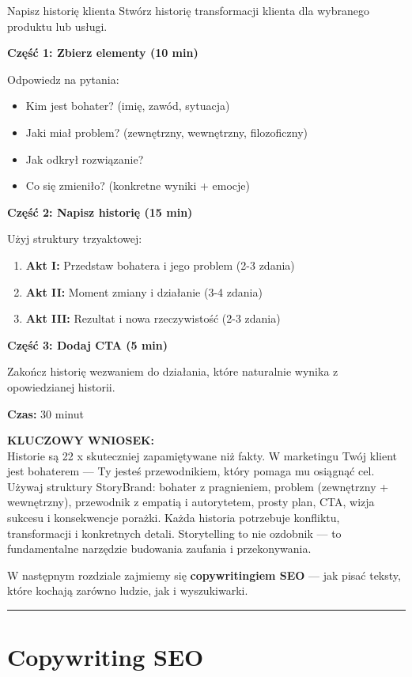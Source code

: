 \documentclass[
  12pt,
  a4paper,
  twoside,
  openright,
  12pt,
  DIV=12,
  BCOR=12mm]{scrbook}
\newcommand{\decoline}{%
  \begin{center}
    \textcolor{bordergray}{\rule{0.3\textwidth}{0.5pt}}
  \end{center}
}
\newcommand{\takeaway}[1]{%
  \begin{tcolorbox}[
    enhanced,
    colback=accentgreen!10,
    colframe=accentgreen,
    boxrule=0pt,
    borderline south={3pt}{0pt}{accentgreen},
    sharp corners,
    left=15pt, right=15pt, top=10pt, bottom=10pt
  ]
    \textbf{\color{accentgreen}KLUCZOWY WNIOSEK:}\\[5pt]
    #1
  \end{tcolorbox}
}
\begin{document}
\begin{cwiczenie}{Napisz historię klienta}
Stwórz historię transformacji klienta dla wybranego produktu lub usługi.

\textbf{Część 1: Zbierz elementy (10 min)}

Odpowiedz na pytania:
\begin{itemize}
  \item Kim jest bohater? (imię, zawód, sytuacja)
  \item Jaki miał problem? (zewnętrzny, wewnętrzny, filozoficzny)
  \item Jak odkrył rozwiązanie?
  \item Co się zmieniło? (konkretne wyniki + emocje)
\end{itemize}

\textbf{Część 2: Napisz historię (15 min)}

Użyj struktury trzyaktowej:
\begin{enumerate}
  \item \textbf{Akt I:} Przedstaw bohatera i jego problem (2-3 zdania)
  \item \textbf{Akt II:} Moment zmiany i działanie (3-4 zdania)
  \item \textbf{Akt III:} Rezultat i nowa rzeczywistość (2-3 zdania)
\end{enumerate}

\textbf{Część 3: Dodaj CTA (5 min)}

Zakończ historię wezwaniem do działania, które naturalnie wynika z opowiedzianej historii.

\textbf{Czas:} 30 minut
\end{cwiczenie}

\takeaway{Historie są 22 x skuteczniej zapamiętywane niż fakty. W marketingu Twój klient jest bohaterem --- Ty jesteś przewodnikiem, który pomaga mu osiągnąć cel. Używaj struktury StoryBrand: bohater z pragnieniem, problem (zewnętrzny + wewnętrzny), przewodnik z empatią i autorytetem, prosty plan, CTA, wizja sukcesu i konsekwencje porażki. Każda historia potrzebuje konfliktu, transformacji i konkretnych detali. Storytelling to nie ozdobnik --- to fundamentalne narzędzie budowania zaufania i przekonywania.}

W następnym rozdziale zajmiemy się \textbf{copywritingiem SEO} --- jak
pisać teksty, które kochają zarówno ludzie, jak i wyszukiwarki.

\decoline


\chapter{Copywriting SEO}\label{copywriting-seo}
\end{document}
